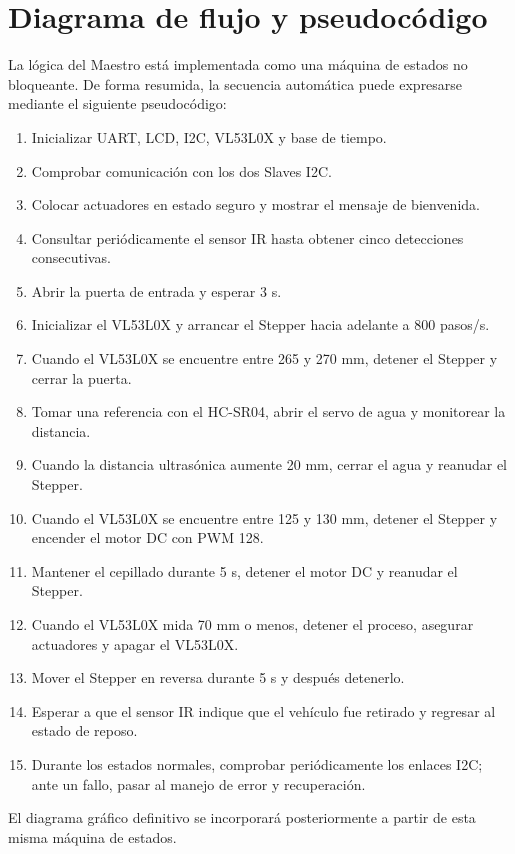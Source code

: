 \section{Diagrama de flujo y pseudocódigo}

La lógica del Maestro está implementada como una máquina de estados no bloqueante. De forma resumida, la secuencia automática puede expresarse mediante el siguiente pseudocódigo:

\begin{enumerate}[leftmargin=*]
    \item Inicializar UART, LCD, I2C, VL53L0X y base de tiempo.
    \item Comprobar comunicación con los dos Slaves I2C.
    \item Colocar actuadores en estado seguro y mostrar el mensaje de bienvenida.
    \item Consultar periódicamente el sensor IR hasta obtener cinco detecciones consecutivas.
    \item Abrir la puerta de entrada y esperar 3 s.
    \item Inicializar el VL53L0X y arrancar el Stepper hacia adelante a 800 pasos/s.
    \item Cuando el VL53L0X se encuentre entre 265 y 270 mm, detener el Stepper y cerrar la puerta.
    \item Tomar una referencia con el HC-SR04, abrir el servo de agua y monitorear la distancia.
    \item Cuando la distancia ultrasónica aumente 20 mm, cerrar el agua y reanudar el Stepper.
    \item Cuando el VL53L0X se encuentre entre 125 y 130 mm, detener el Stepper y encender el motor DC con PWM 128.
    \item Mantener el cepillado durante 5 s, detener el motor DC y reanudar el Stepper.
    \item Cuando el VL53L0X mida 70 mm o menos, detener el proceso, asegurar actuadores y apagar el VL53L0X.
    \item Mover el Stepper en reversa durante 5 s y después detenerlo.
    \item Esperar a que el sensor IR indique que el vehículo fue retirado y regresar al estado de reposo.
    \item Durante los estados normales, comprobar periódicamente los enlaces I2C; ante un fallo, pasar al manejo de error y recuperación.
\end{enumerate}

El diagrama gráfico definitivo se incorporará posteriormente a partir de esta misma máquina de estados.
